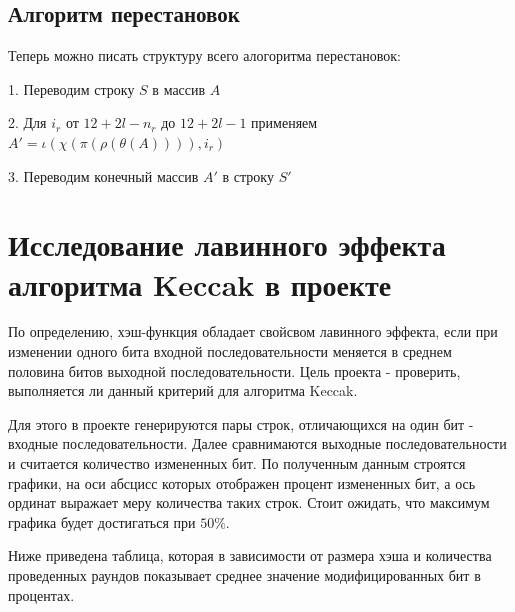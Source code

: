 \documentclass[a4paper,12pt]{article}
\theoremstyle{plain} %
\theoremstyle{definition} %
\theoremstyle{remark} %
\begin{document}
	\subsection{Алгоритм перестановок}
	
	Теперь можно писать структуру всего алогоритма перестановок:
	
	1. Переводим строку $S$ в массив $A$
	
	2. Для $i_r$ от $12 + 2l - n_r$ до $12 + 2l - 1$ применяем $A' = \iota(\chi(\pi(\rho(\theta(A)))), i_r)$
	
	3. Переводим конечный массив $A'$ в строку $S'$
	
	
	
	\section{Исследование лавинного эффекта алгоритма Keccak в проекте}
	
	По определению, хэш-функция обладает свойсвом лавинного эффекта, если при изменении одного бита входной последовательности меняется в среднем половина битов выходной последовательности. Цель проекта - проверить, выполняется ли данный критерий для алгоритма Keccak.
	
	Для этого в проекте генерируются пары строк, отличающихся на один бит - входные последовательности. Далее сравнимаются выходные последовательности и считается количество измененных бит. По полученным данным строятся графики, на оси абсцисс которых отображен процент измененных бит, а ось ординат выражает меру количества таких строк. Стоит ожидать, что максимум графика будет достигаться при $50\%$.
	
	Ниже приведена таблица, которая в зависимости от размера хэша и количества проведенных раундов показывает среднее значение модифицированных бит в процентах.
	
\end{document}

